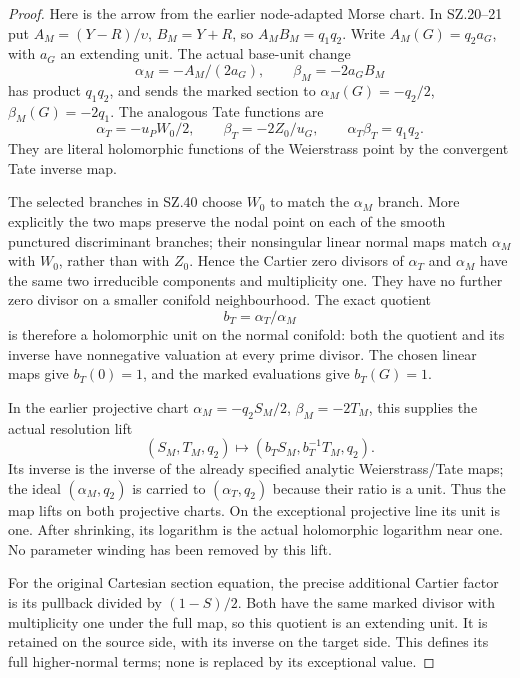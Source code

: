 \begin{proof}
Here is the arrow from the earlier node-adapted Morse chart. In
SZ.20--21 put \(A_M=(Y-R)/\upsilon\), \(B_M=Y+R\), so
\(A_MB_M=q_1q_2\). Write
\(A_M(G)=q_2a_G\), with \(a_G\) an extending unit. The actual
base-unit change
\[
 \alpha_M=-A_M/(2a_G),\qquad
 \beta_M=-2a_GB_M                                  \tag{P3K.80.TL.4}
\]
has product \(q_1q_2\), and sends the marked section to
\(\alpha_M(G)=-q_2/2\), \(\beta_M(G)=-2q_1\). The analogous
Tate functions are
\[
 \alpha_T=-u_PW_0/2,\qquad \beta_T=-2Z_0/u_G,
 \qquad \alpha_T\beta_T=q_1q_2.                     \tag{P3K.80.TL.5}
\]
They are literal holomorphic functions of the Weierstrass point by
the convergent Tate inverse map.

The selected branches in SZ.40 choose \(W_0\) to match the
\(\alpha_M\) branch. More explicitly the two maps preserve the
nodal point on each of the smooth punctured discriminant branches;
their nonsingular linear normal maps match \(\alpha_M\) with
\(W_0\), rather than with \(Z_0\). Hence the Cartier zero divisors
of \(\alpha_T\) and \(\alpha_M\) have the same two irreducible
components and multiplicity one. They have no further zero divisor
on a smaller conifold neighbourhood. The exact quotient
\[
                      b_T=\alpha_T/\alpha_M          \tag{P3K.80.TL.6}
\]
is therefore a holomorphic unit on the normal conifold: both the
quotient and its inverse have nonnegative valuation at every
prime divisor. The chosen linear maps give \(b_T(0)=1\), and
the marked evaluations give \(b_T(G)=1\).

In the earlier projective chart
\(\alpha_M=-q_2S_M/2\), \(\beta_M=-2T_M\), this supplies the
actual resolution lift
\[
             (S_M,T_M,q_2)\longmapsto
                    (b_TS_M,b_T^{-1}T_M,q_2).        \tag{P3K.80.TL.7}
\]
Its inverse is the inverse of the already specified analytic
Weierstrass/Tate maps; the ideal \((\alpha_M,q_2)\) is carried
to \((\alpha_T,q_2)\) because their ratio is a unit. Thus the
map lifts on both projective charts. On the exceptional projective
line its unit is one. After shrinking, its logarithm is the actual
holomorphic logarithm near one. No parameter winding has been
removed by this lift.

For the original Cartesian section equation, the precise additional
Cartier factor is its pullback divided by \((1-S)/2\). Both have
the same marked divisor with multiplicity one under the full map,
so this quotient is an extending unit. It is retained on the source
side, with its inverse on the target side. This defines its full
higher-normal terms; none is replaced by its exceptional value.


\end{proof}
